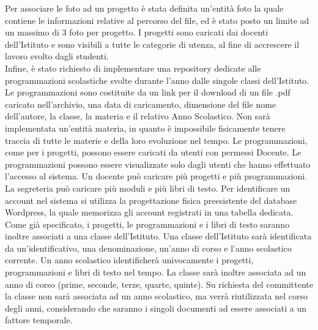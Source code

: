 \documentclass{article}
\begin{document}
	Per associare le foto ad un progetto è stata definita un'entità foto la quale contiene le informazioni relative al percorso del file, ed è stato posto un limite ad un massimo di 3 foto per progetto.
	I progetti sono caricati dai docenti dell'Istituto e sono visibili a tutte le categorie di utenza, al fine di accrescere il lavoro svolto dagli studenti.\\
	Infine, è stato richiesto di implementare una repository dedicate alle programmazioni scolastiche svolte durante l'anno dalle singole classi dell'Istituto.
	Le programmazioni sono costituite da un link per il download di un file .pdf caricato nell'archivio, una data di caricamento, dimensione del file nome dell'autore, la classe, la materia e il relativo Anno Scolastico. Non sarà implementata un'entità materia, in quanto è impossibile fisicamente tenere traccia di tutte le materie e della loro evoluzione nel tempo.
	Le programmazioni, come per i progetti, possono essere caricati da utenti con permessi Docente.
	Le programmazioni possono essere visualizzate solo dagli utenti che hanno effettuato l'accesso al sistema.
	Un docente può caricare più progetti e più programmazioni. La segreteria può caricare più moduli e più libri di testo.
	Per identificare un account nel sistema si utilizza la progettazione fisica preesistente del database Wordpress, la quale memorizza gli account registrati in una tabella dedicata. 
	Come già specificato, i progetti, le programmazioni e i libri di testo saranno inoltre associati a una classe dell'Istituto. Una classe dell'Istituto sarà identificata da un'identificativo, una denominazione, un'anno di corso e l'anno scolastico corrente. Un anno scolastico identificherà univocamente i progetti, programmazioni e libri di testo nel tempo. La classe sarà inoltre associata ad un anno di corso (prime, seconde, terze, quarte, quinte). Su richiesta del committente la classe non sarà associata ad un anno scolastico, ma verrà riutilizzata nel corso degli anni, considerando che saranno i singoli documenti ad essere associati a un fattore temporale. 
\end{document}
